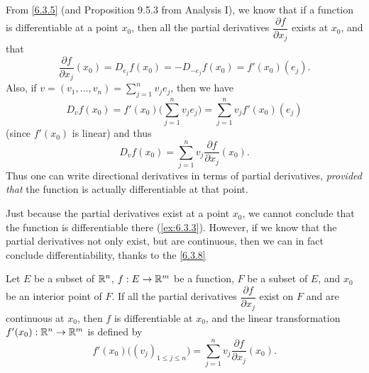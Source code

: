 \begin{ac}\label{ac:6.3.2}
  From \cref{6.3.5} (and Proposition 9.5.3 from Analysis I), we know that if a function is differentiable at a point \(x_0\), then all the partial derivatives \(\dfrac{\partial f}{\partial x_j}\) exists at \(x_0\), and that
  \[
    \dfrac{\partial f}{\partial x_j}(x_0) = D_{e_j} f(x_0) = - D_{-e_j} f(x_0) = f'(x_0)(e_j).
  \]
  Also, if \(v = (v_1, \dots, v_n) = \sum_{j = 1}^n v_j e_j\), then we have
  \[
    D_v f(x_0) = f'(x_0) \bigg(\sum_{j = 1}^n v_j e_j\bigg) = \sum_{j = 1}^n v_j f'(x_0)(e_j)
  \]
  (since \(f'(x_0)\) is linear) and thus
  \[
    D_v f(x_0) = \sum_{j = 1}^n v_j \dfrac{\partial f}{\partial x_j}(x_0).
  \]
  Thus one can write directional derivatives in terms of partial derivatives, \emph{provided that} the function is actually differentiable at that point.
\end{ac}

\begin{note}
  Just because the partial derivatives exist at a point \(x_0\), we cannot conclude that the function is differentiable there (\cref{ex:6.3.3}).
  However, if we know that the partial derivatives not only exist, but are continuous, then we can in fact conclude differentiability, thanks to the \cref{6.3.8}
\end{note}

\begin{thm}\label{6.3.8}
  Let \(E\) be a subset of \(\mathbb{R}^n\), \(f : E \to \mathbb{R}^m\) be a function, \(F\) be a subset of \(E\), and \(x_0\) be an interior point of \(F\).
  If all the partial derivatives \(\dfrac{\partial f}{\partial x_j}\) exist on \(F\) and are continuous at \(x_0\), then \(f\) is differentiable at \(x_0\), and the linear transformation \(f'(x_0) : \mathbb{R}^n \to \mathbb{R}^m\) is defined by
  \[
    f'(x_0)\big((v_j)_{1 \leq j \leq n}\big) = \sum_{j = 1}^n v_j \dfrac{\partial f}{\partial x_j}(x_0).
  \]
\end{thm}

